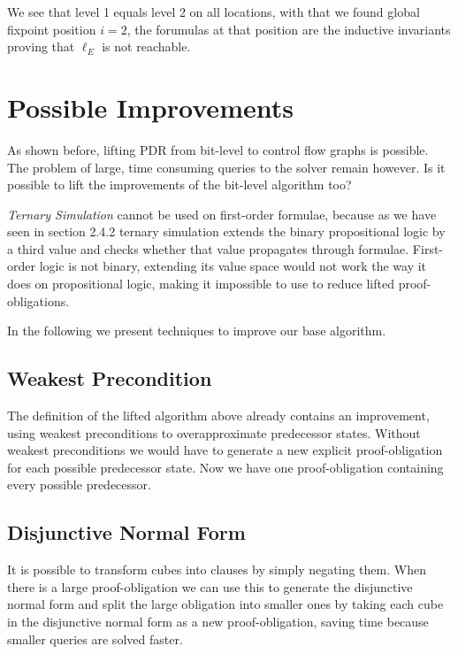 \documentclass[11pt, a4paper, BCOR=10mm, ngerman]{scrbook}
\begin{document}
\hspace*{5cm}

We see that level 1 equals level 2 on all locations, with that we found global fixpoint position $i = 2$, the forumulas at that position are the inductive invariants proving that $\ell_E$ is not reachable.


\section{Possible Improvements}
\label{improvements}

As shown before, lifting PDR from bit-level to control flow graphs is possible. The problem of large, time consuming queries to the solver remain however. Is it possible to lift the improvements of the bit-level algorithm too? \par

\textsl{Ternary Simulation} cannot be used on first-order formulae, because as we have seen in section 2.4.2 ternary simulation extends the binary propositional logic by a third value and checks whether that value propagates through formulae. First-order logic is not binary, extending its value space would not work the way it does on propositional logic,
making it impossible to use to reduce lifted proof-obligations. \par
In the following we present techniques to improve our base algorithm.

\subsection{Weakest Precondition}
The definition of the lifted algorithm above already contains an improvement, using weakest preconditions to overapproximate predecessor states. Without weakest preconditions we would have to generate a new explicit proof-obligation for each possible predecessor state. Now we have one proof-obligation containing every possible predecessor.


\subsection{Disjunctive Normal Form}
It is possible to transform cubes into clauses by simply negating them. When there is a large proof-obligation we can use this to generate the disjunctive normal form and split the large obligation into smaller ones by taking each cube in the disjunctive normal form as a new proof-obligation, saving time because smaller queries are solved faster.
\end{document}
